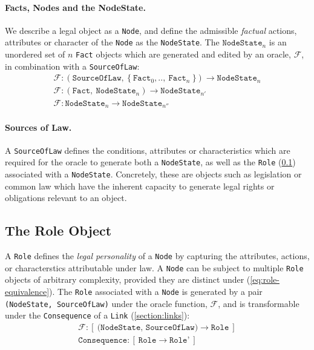 \documentclass{article}
\numberwithin{equation}{section}
\begin{document}
\paragraph{Facts, Nodes and the NodeState.} We describe a legal object as a \texttt{Node}, and define the admissible \textit{factual} actions, attributes or character of the \texttt{Node} as the \texttt{NodeState}. The $\texttt{NodeState}_n$ is an unordered set of $n$  \texttt{Fact} objects which are generated and edited by an oracle, $\mathcal{F}$, in combination with a \texttt{SourceOfLaw}: %
\begin{align}
	\mathcal{F}: (\texttt{SourceOfLaw}, \ \{ \ \texttt{Fact}_0, .., \ \texttt{Fact}_n \ \}) \rightarrow \texttt{NodeState}_n \\
	\mathcal{F}: (\texttt{Fact}, \ \texttt{NodeState}_n) \rightarrow \texttt{NodeState}_{n'} \\
	\mathcal{F}: \texttt{NodeState}_n \rightarrow \texttt{NodeState}_{n''}
\end{align}

\paragraph{Sources of Law.} A \texttt{SourceOfLaw} defines the conditions, attributes or characteristics which are required for the oracle to generate both a \texttt{NodeState}, as well as the \texttt{Role} (\ref{section:role-object}) associated with a \texttt{NodeState}. Concretely, these are objects such as legislation or common law which have the inherent capacity to generate legal rights or obligations relevant to an object.


\subsection{The Role Object} \label{section:role-object}

A \texttt{Role} defines the \textit{legal personality} of a \texttt{Node} by capturing the attributes, actions, or characterstics attributable under law. A \texttt{Node} can be subject to multiple \texttt{Role} objects of arbitrary complexity, provided they are distinct under (\ref{eq:role-equivalence}). The \texttt{Role} associated with a \texttt{Node} is generated by a pair \texttt{(NodeState, SourceOfLaw)} under the oracle function, $\mathcal{F}$, and is transformable under the \texttt{Consequence} of a \texttt{Link} (\ref{section:links}): 
\begin{align}	
	\mathcal{F} : [ \ \texttt{(NodeState, SourceOfLaw)} \rightarrow \texttt{Role} \ ] \\
	\texttt{Consequence} : [ \ \texttt{Role} \rightarrow \texttt{Role'} \ ]
\end{align}
\end{document}
